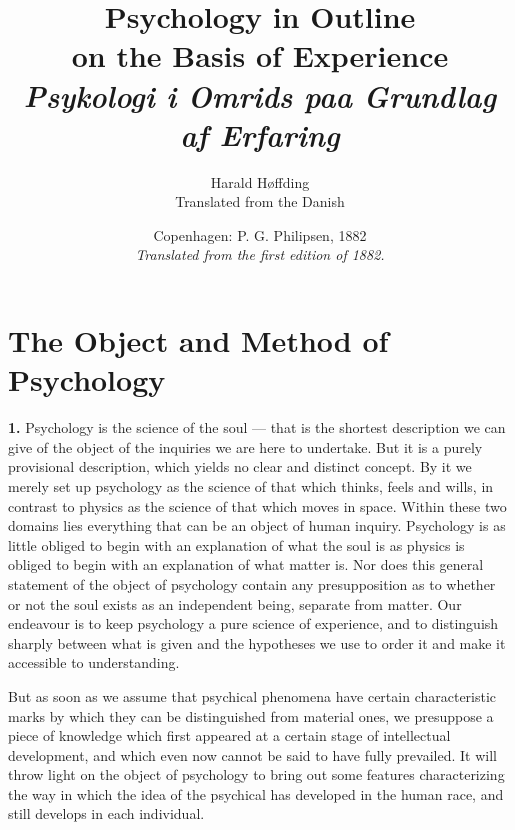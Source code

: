 \documentclass[12pt,a4paper]{book}
\title{\textbf{Psychology in Outline}\\[6pt]
  \large on the Basis of Experience\\[6pt]
  \normalsize\textit{Psykologi i Omrids paa Grundlag af Erfaring}}
\author{Harald Høffding\\[4pt]
  \small Translated from the Danish}
\date{Copenhagen: P. G. Philipsen, 1882\\[6pt]
  \small \textit{Translated from the first edition of 1882.}}
\newcommand{\opage}[1]{\marginnote{\footnotesize\textit{[#1]}}}
\begin{document}
\maketitle
\thispagestyle{empty}
\newpage
\tableofcontents
\newpage

\chapter[The Object and Method of Psychology]{The Object and Method of Psychology\opage{1}}
\label{ch:object-method}

\noindent\textbf{1.} Psychology is the science of the soul --- that is
the shortest description we can give of the object of the inquiries we
are here to undertake. But it is a purely provisional description, which
yields no clear and distinct concept. By it we merely set up psychology
as the science of that which thinks, feels and wills, in contrast to
physics as the science of that which moves in space. Within these two
domains lies everything that can be an object of human inquiry.
Psychology is as little obliged to begin with an explanation of what the
soul is as physics is obliged to begin with an explanation of what
matter is. Nor does this general statement of the object of psychology
contain any presupposition as to whether or not the soul exists as an
independent being, separate from matter. Our endeavour is to keep
psychology a pure science of experience, and to distinguish sharply
between what is given and the hypotheses we use to order it and make it
accessible to understanding.

But as soon as we assume that psychical phenomena have certain
characteristic marks by which they can be distinguished from material
ones, we presuppose a piece of knowledge which first appeared at a
certain stage of intellectual development, and which even now cannot be
said to have fully prevailed. It will throw light on the object of
psychology to bring out some features characterizing the way in which
the idea of the psychical has developed in the human race, and still
develops in each individual.
\end{document}
